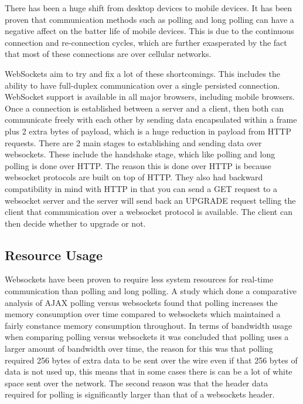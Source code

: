 There has been a huge shift from desktop devices to mobile devices\cite{6365155}. It has been proven that communication methods such as polling and long polling can have a negative affect on the batter life of mobile devices\cite{6364271}. This is due to the continuous connection and re-connection cycles, which are further exasperated by the fact that most of these connections are over cellular networks.

WebSockets aim to try and fix a lot of these shortcomings. This includes the ability to have full-duplex communication over a single persisted connection. WebSocket support is available in all major browsers, including mobile browsers. Once a connection is established between a server and a client, then both can communicate freely with each other by sending data encapsulated within a frame plus 2 extra bytes of payload, which is a huge reduction in payload from HTTP requests. There are 2 main stages to establishing and sending data over websockets. These include the handshake stage, which like polling and long polling is done over HTTP. The reason this is done over HTTP is because websocket protocols are built on top of HTTP. They also had backward compatibility in mind with HTTP in that you can send a GET request to a websocket server and the server will send back an UPGRADE request telling the client that communication over a websocket protocol is available. The client can then decide whether to upgrade or not.

\subsection{Resource Usage}

Websockets have been proven to require less system resources for real-time communication than polling and long polling. A study which done a comparative analysis of AJAX polling versus websockets found that polling increases the memory consumption over time compared to websockets which maintained a fairly constance memory consumption throughout\cite{6601579}. In terms of bandwidth usage when comparing polling versus websockets it was concluded that polling uses a larger amount of bandwidth over time, the reason for this was that polling required 256 bytes of extra data to be sent over the wire even if that 256 bytes of data is not used up, this means that in some cases there is can be a lot of white space sent over the network. The second reason was that the header data required for polling is significantly larger than that of a websockets header\cite{6601579}.

